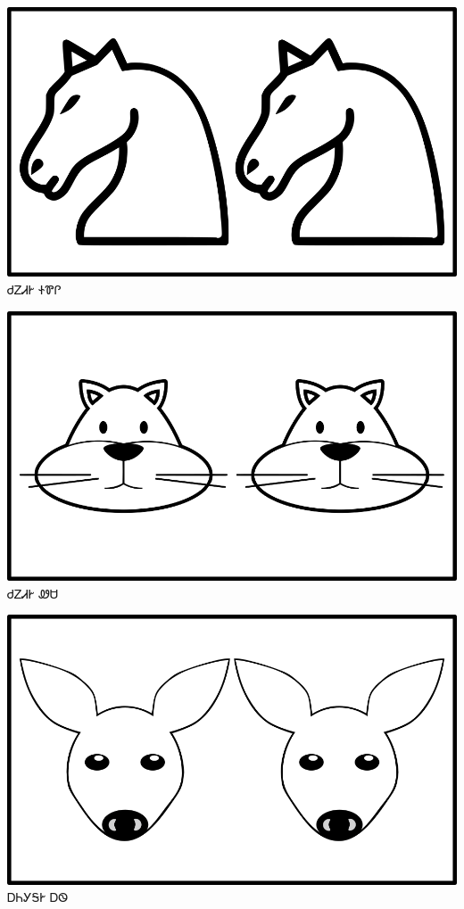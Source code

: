 \documentclass[avery5371]{flashcards}%
\begin{document}
\begin{flashcard}{
\includegraphics[width=0.95\columnwidth,height=.51\columnwidth,keepaspectratio]{../artwork/objects-animate/anitali-soquili}
}\Huge ᏧᏃᏗᎨ ᏐᏈᎵ
\end{flashcard}

\begin{flashcard}{
\includegraphics[width=0.95\columnwidth,height=.51\columnwidth,keepaspectratio]{../artwork/objects-animate/anitali-wesa}
}\Huge ᏧᏃᏗᎨ ᏪᏌ
\end{flashcard}

\begin{flashcard}{
\includegraphics[width=0.95\columnwidth,height=.51\columnwidth,keepaspectratio]{../artwork/objects-animate/anitali-ahwi}
}\Huge ᎠᏂᎩᎦᎨ ᎠᏫ
\end{flashcard}
\end{document}
